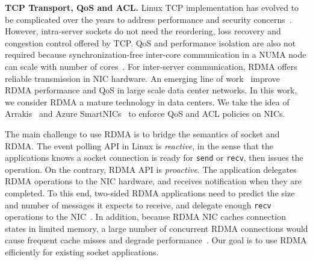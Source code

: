 
\textbf{TCP Transport, QoS and ACL.}
Linux TCP implementation has evolved to be complicated over the years to address performance and security concerns~\cite{yasukata2016stackmap}. However, intra-server sockets do not need the reordering, loss recovery and congestion control offered by TCP. QoS and performance isolation are also not required because synchronization-free inter-core communication in a NUMA node can scale with number of cores~\cite{intel-manual}. For inter-server communication, RDMA offers reliable transmission in NIC hardware. An emerging line of work~\cite{zhu2015congestion,guo2016rdma,lu2017memory,mprdma} improve RDMA performance and QoS in large scale data center networks. In this work, we consider RDMA a mature technology in data centers. We take the idea of Arrakis~\cite{peter2016arrakis} and Azure SmartNICs~\cite{smartnic} to enforce QoS and ACL policies on NICs.

The main challenge to use RDMA is to bridge the semantics of socket and RDMA. The event polling API in Linux is \textit{reactive}, in the sense that the applications knows a socket connection is ready for \texttt{send} or \texttt{recv}, then issues the operation.
On the contrary, RDMA API is \textit{proactive}. The application delegates RDMA operations to the NIC hardware, and receives notification when they are completed.
To this end, two-sided RDMA applications need to predict the size and number of messages it expects to receive, and delegate enough \texttt{recv} operations to the NIC~\cite{huang2017high}.
In addition, because RDMA NIC caches connection states in limited memory, a large number of concurrent RDMA connections would cause frequent cache misses and degrade performance~\cite{mprdma,kaminsky2016design}.
Our goal is to use RDMA efficiently for existing socket applications.
